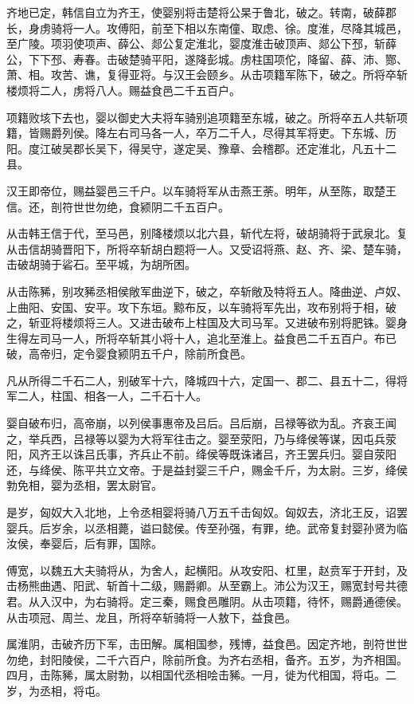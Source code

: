 \documentclass[]{article}
\begin{document}
齐地已定，韩信自立为齐王，使婴别将击楚将公杲于鲁北，破之。转南，破薛郡长，身虏骑将一人。攻傅阳，前至下相以东南僮、取虑、徐。度淮，尽降其城邑，至广陵。项羽使项声、薛公、郯公复定淮北，婴度淮击破顶声、郯公下邳，斩薛公，下下邳、寿春。击破楚骑平阳，遂降彭城。虏柱国项佗，降留、薛、沛、酂、萧、相。攻苦、谯，复得亚将。与汉王会颐乡。从击项籍军陈下，破之。所将卒斩楼烦将二人，虏将八人。赐益食邑二千五百户。

项籍败垓下去也，婴以御史大夫将车骑别追项籍至东城，破之。所将卒五人共斩项籍，皆赐爵列侯。降左右司马各一人，卒万二千人，尽得其军将吏。下东城、历阳。度江破吴郡长吴下，得吴守，遂定吴、豫章、会稽郡。还定淮北，凡五十二县。

汉王即帝位，赐益婴邑三千户。以车骑将军从击燕王荼。明年，从至陈，取楚王信。还，剖符世世勿绝，食颍阴二千五百户。

从击韩王信于代，至马邑，别降楼烦以北六县，斩代左将，破胡骑将于武泉北。复从击信胡骑晋阳下，所将卒斩胡白题将一人。又受诏将燕、赵、齐、梁、楚车骑，击破胡骑于硰石。至平城，为胡所困。

从击陈豨，别攻豨丞相侯敞军曲逆下，破之，卒斩敞及特将五人。降曲逆、卢奴、上曲阳、安国、安平。攻下东垣。黥布反，以车骑将军先出，攻布别将于相，破之，斩亚将楼烦将三人。又进击破布上柱国及大司马军。又进破布别将肥铢。婴身生得左司马一人，所将卒斩其小将十人，追北至淮上。益食邑二千五百户。布已破，高帝归，定令婴食颍阴五千户，除前所食邑。

凡从所得二千石二人，别破军十六，降城四十六，定国一、郡二、县五十二，得将军二人，柱国、相各一人，二千石十人。

婴自破布归，高帝崩，以列侯事惠帝及吕后。吕后崩，吕禄等欲为乱。齐哀王闻之，举兵西，吕禄等以婴为大将军往击之。婴至荥阳，乃与绛侯等谋，因屯兵荥阳，风齐王以诛吕氏事，齐兵止不前。绛侯等既诛诸吕，齐王罢兵归。婴自荥阳还，与绛侯、陈平共立文帝。于是益封婴三千户，赐金千斤，为太尉。三岁，绛侯勃免相，婴为丞相，罢太尉官。

是岁，匈奴大入北地，上令丞相婴将骑八万五千击匈奴。匈奴去，济北王反，诏罢婴兵。后岁余，以丞相薨，谥曰懿侯。传至孙强，有罪，绝。武帝复封婴孙贤为临汝侯，奉婴后，后有罪，国除。

傅宽，以魏五大夫骑将从，为舍人，起横阳。从攻安阳、杠里，赵贲军于开封，及击杨熊曲遇、阳武、斩首十二级，赐爵卿。从至霸上。沛公为汉王，赐宽封号共德君。从入汉中，为右骑将。定三秦，赐食邑雕阴。从击项籍，待怀，赐爵通德侯。从击项冠、周兰、龙且，所将卒斩骑将一人敖下，益食邑。

属淮阴，击破齐历下军，击田解。属相国参，残博，益食邑。因定齐地，剖符世世勿绝，封阳陵侯，二千六百户，除前所食。为齐右丞相，备齐。五岁，为齐相国。四月，击陈豨，属太尉勃，以相国代丞相哙击豨。一月，徙为代相国，将屯。二岁，为丞相，将屯。
\end{document}
